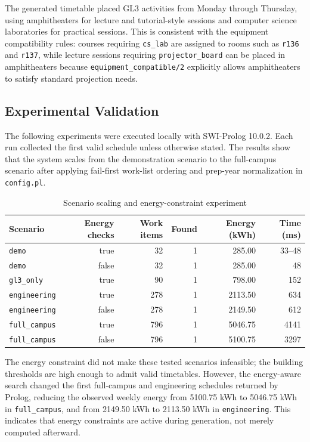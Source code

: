 \documentclass[12pt,a4paper]{article}
\newcommand{\predicate}[1]{\texttt{#1}}
\newcommand{\term}[1]{\texttt{#1}}
\begin{document}
The generated timetable placed GL3 activities from Monday through Thursday, using amphitheaters for lecture and tutorial-style sessions and computer science laboratories for practical sessions. This is consistent with the equipment compatibility rules: courses requiring \term{cs\_lab} are assigned to rooms such as \term{r136} and \term{r137}, while lecture sessions requiring \term{projector\_board} can be placed in amphitheaters because \predicate{equipment\_compatible/2} explicitly allows amphitheaters to satisfy standard projection needs.

\subsection{Experimental Validation}

The following experiments were executed locally with SWI-Prolog 10.0.2. Each run collected the first valid schedule unless otherwise stated. The results show that the system scales from the demonstration scenario to the full-campus scenario after applying fail-first work-list ordering and prep-year normalization in \predicate{config.pl}.

\begin{table}[h]
    \centering
    \caption{Scenario scaling and energy-constraint experiment}
    \begin{tabular}{lrrrrr}
        \toprule
        Scenario & Energy checks & Work items & Found & Energy (kWh) & Time (ms) \\
        \midrule
        \term{demo} & true & 32 & 1 & 285.00 & 33--48 \\
        \term{demo} & false & 32 & 1 & 285.00 & 48 \\
        \term{gl3\_only} & true & 90 & 1 & 798.00 & 152 \\
        \term{engineering} & true & 278 & 1 & 2113.50 & 634 \\
        \term{engineering} & false & 278 & 1 & 2149.50 & 612 \\
        \term{full\_campus} & true & 796 & 1 & 5046.75 & 4141 \\
        \term{full\_campus} & false & 796 & 1 & 5100.75 & 3297 \\
        \bottomrule
    \end{tabular}
\end{table}

The energy constraint did not make these tested scenarios infeasible; the building thresholds are high enough to admit valid timetables. However, the energy-aware search changed the first full-campus and engineering schedules returned by Prolog, reducing the observed weekly energy from 5100.75 kWh to 5046.75 kWh in \term{full\_campus}, and from 2149.50 kWh to 2113.50 kWh in \term{engineering}. This indicates that energy constraints are active during generation, not merely computed afterward.
\end{document}

